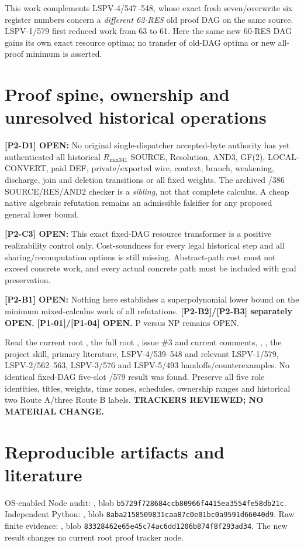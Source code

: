\documentclass[11pt]{article}
\begin{document}
This work complements LSPV-4/547--548, whose exact fresh seven/overwrite six register numbers concern a \emph{different 62-RES} old proof DAG on the same source. LSPV-1/579 first reduced work from 63 to 61. Here the same new 60-RES DAG gains its own exact resource optima; no transfer of old-DAG optima or new all-proof minimum is asserted.

\section*{Proof spine, ownership and unresolved historical operations}
\textbf{[P2-D1] OPEN:} No original single-dispatcher accepted-byte authority has yet authenticated all historical $R_{\mathrm{mix341}}$ SOURCE, Resolution, AND3, GF(2), LOCAL-CONVERT, paid DEF, private/exported wire, context, branch, weakening, discharge, join and deletion transitions or all fixed weights. The archived /386 SOURCE/RES/AND2 checker is a \emph{sibling}, not that complete calculus. A cheap native algebraic refutation remains an admissible falsifier for any proposed general lower bound.

\textbf{[P2-C3] OPEN:} This exact fixed-DAG resource transformer is a positive realizability control only. Cost-soundness for every legal historical step and all sharing/recomputation options is still missing. Abstract-path cost must not exceed concrete work, and every actual concrete path must be included with goal preservation.

\textbf{[P2-B1] OPEN:} Nothing here establishes a superpolynomial lower bound on the minimum mixed-calculus work of all refutations. \textbf{[P2-B2]/[P2-B3] separately OPEN.} \textbf{[P1-01]/[P1-04] OPEN.} P versus NP remains OPEN.

Read the current root , the full root , issue \#3 and current comments, , , the project skill, primary literature, LSPV-4/539--548 and relevant LSPV-1/579, LSPV-2/562--563, LSPV-3/576 and LSPV-5/493 handoffs/counterexamples. No identical fixed-DAG five-slot /579 result was found. Preserve all five role identities, titles, weights, time zones, schedules, ownership ranges and historical two Route A/three Route B labels. \textbf{TRACKERS REVIEWED; NO MATERIAL CHANGE.}

\section*{Reproducible artifacts and literature}
OS-enabled Node audit: , blob \texttt{b5729f728684ccb80966f4415ea3554fe58db21c}. Independent Python: , blob \texttt{8aba2158509831caa87c0e01bc0a9591d66040d9}. Raw finite evidence: , blob \texttt{83328462e65e45c74ac6dd1206b874f8f293ad34}. The new result changes no current root proof tracker node.
\end{document}
